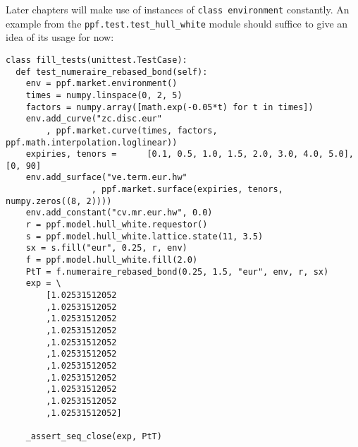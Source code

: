 Later chapters will make use of instances of \verb|class environment|
constantly. An example from the \verb|ppf.test.test_hull_white| module
should suffice to give an idea of its usage for now:
\begin{verbatim}
class fill_tests(unittest.TestCase):
  def test_numeraire_rebased_bond(self):
    env = ppf.market.environment()
    times = numpy.linspace(0, 2, 5)
    factors = numpy.array([math.exp(-0.05*t) for t in times])
    env.add_curve("zc.disc.eur"
        , ppf.market.curve(times, factors, ppf.math.interpolation.loglinear))
    expiries, tenors =      [0.1, 0.5, 1.0, 1.5, 2.0, 3.0, 4.0, 5.0], [0, 90]
    env.add_surface("ve.term.eur.hw"
                 , ppf.market.surface(expiries, tenors, numpy.zeros((8, 2))))
    env.add_constant("cv.mr.eur.hw", 0.0)
    r = ppf.model.hull_white.requestor()
    s = ppf.model.hull_white.lattice.state(11, 3.5)
    sx = s.fill("eur", 0.25, r, env)
    f = ppf.model.hull_white.fill(2.0)
    PtT = f.numeraire_rebased_bond(0.25, 1.5, "eur", env, r, sx)
    exp = \
        [1.02531512052
        ,1.02531512052
        ,1.02531512052
        ,1.02531512052
        ,1.02531512052
        ,1.02531512052
        ,1.02531512052
        ,1.02531512052
        ,1.02531512052
        ,1.02531512052
        ,1.02531512052]

    _assert_seq_close(exp, PtT)
\end{verbatim}
